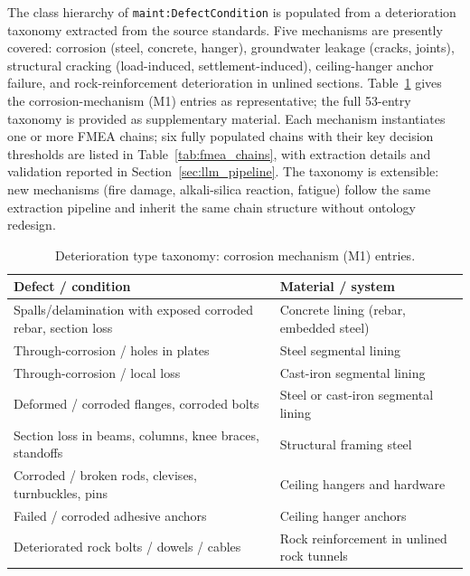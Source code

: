 \documentclass[11pt,a4paper]{article}
\begin{document}
The class hierarchy of \texttt{maint:DefectCondition} is populated from a deterioration taxonomy extracted from the source standards. Five mechanisms are presently covered: corrosion (steel, concrete, hanger), groundwater leakage (cracks, joints), structural cracking (load-induced, settlement-induced), ceiling-hanger anchor failure, and rock-reinforcement deterioration in unlined sections. Table~\ref{tab:taxonomy} gives the corrosion-mechanism (M1) entries as representative; the full 53-entry taxonomy is provided as supplementary material. Each mechanism instantiates one or more FMEA chains; six fully populated chains with their key decision thresholds are listed in Table~\ref{tab:fmea_chains}, with extraction details and validation reported in Section~\ref{sec:llm_pipeline}. The taxonomy is extensible: new
mechanisms (fire damage, alkali-silica reaction, fatigue) follow the same extraction pipeline and inherit the same chain structure without ontology redesign.

\begin{table}[htbp]
\centering
\caption{Deterioration type taxonomy: corrosion mechanism (M1) entries.}
\label{tab:taxonomy}
\begin{tabularx}{\textwidth}{
  >{\raggedright\arraybackslash}X
  >{\raggedright\arraybackslash}X
}
\toprule
\textbf{Defect / condition} &
\textbf{Material / system} \\
\midrule
Spalls/delamination with exposed corroded rebar, section loss &
Concrete lining (rebar, embedded steel) \\

Through-corrosion / holes in plates &
Steel segmental lining \\

Through-corrosion / local loss &
Cast-iron segmental lining \\

Deformed / corroded flanges, corroded bolts &
Steel or cast-iron segmental lining \\

Section loss in beams, columns, knee braces, standoffs &
Structural framing steel \\

Corroded / broken rods, clevises, turnbuckles, pins &
Ceiling hangers and hardware \\

Failed / corroded adhesive anchors &
Ceiling hanger anchors \\

Deteriorated rock bolts / dowels / cables &
Rock reinforcement in unlined rock tunnels \\
\bottomrule
\end{tabularx}
\end{table}
\end{document}
